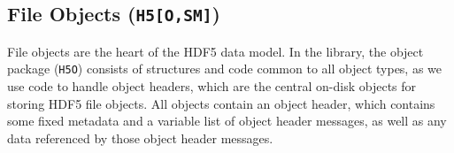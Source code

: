 



\subsection{File Objects (\texttt{H5[O,SM]})}


File objects are the heart of the HDF5 data model. In the library, the object package (\texttt{H5O}) consists of structures and code common to all object types, as we use code to handle object headers, which are the central on-disk objects for storing HDF5 file objects. All objects contain an object header, which contains some fixed metadata and a variable list of object header messages, as well as any data referenced by those object header messages.

